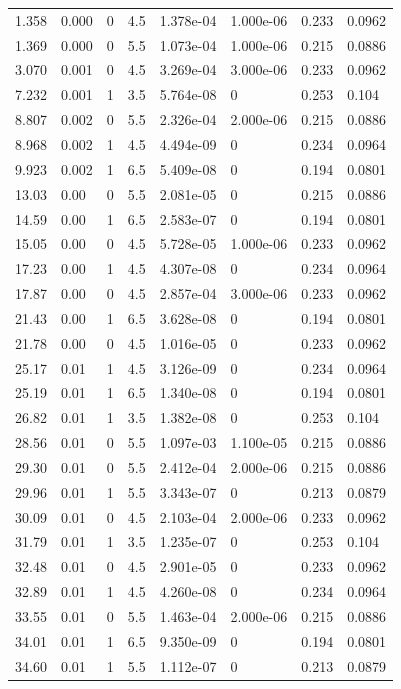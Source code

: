 \documentclass[preview]{standalone}
\begin{document}
{{\begin{tabular}{L{1.2cm}C{1.2cm} C{0.3cm}C{0.5cm} C{1.4cm}C{1.4cm} C{1.4cm}C{1.4cm}}
  1.358  &  0.000  & 0     & 4.5 &  1.378e-04  & 1.000e-06  & 0.233 &  0.0962   \\ 
  1.369  &  0.000  & 0     & 5.5 &  1.073e-04  & 1.000e-06  & 0.215 &  0.0886   \\ 
  3.070  &  0.001  & 0     & 4.5 &  3.269e-04  & 3.000e-06  & 0.233 &  0.0962   \\ 
  7.232  &  0.001  & 1     & 3.5 &  5.764e-08  & 0  & 0.253 &  0.104   \\ 
  8.807  &  0.002  & 0     & 5.5 &  2.326e-04  & 2.000e-06  & 0.215 &  0.0886   \\ 
  8.968  &  0.002  & 1     & 4.5 &  4.494e-09  & 0  & 0.234 &  0.0964   \\ 
  9.923  &  0.002  & 1     & 6.5 &  5.409e-08  & 0  & 0.194 &  0.0801   \\ 
  13.03  &  0.00  & 0     & 5.5 &  2.081e-05  & 0  & 0.215 &  0.0886   \\ 
  14.59  &  0.00  & 1     & 6.5 &  2.583e-07  & 0  & 0.194 &  0.0801   \\ 
  15.05  &  0.00  & 0     & 4.5 &  5.728e-05  & 1.000e-06  & 0.233 &  0.0962   \\ 
  17.23  &  0.00  & 1     & 4.5 &  4.307e-08  & 0  & 0.234 &  0.0964   \\ 
  17.87  &  0.00  & 0     & 4.5 &  2.857e-04  & 3.000e-06  & 0.233 &  0.0962   \\ 
  21.43  &  0.00  & 1     & 6.5 &  3.628e-08  & 0  & 0.194 &  0.0801   \\ 
  21.78  &  0.00  & 0     & 4.5 &  1.016e-05  & 0  & 0.233 &  0.0962   \\ 
  25.17  &  0.01  & 1     & 4.5 &  3.126e-09  & 0  & 0.234 &  0.0964   \\ 
  25.19  &  0.01  & 1     & 6.5 &  1.340e-08  & 0  & 0.194 &  0.0801   \\ 
  26.82  &  0.01  & 1     & 3.5 &  1.382e-08  & 0  & 0.253 &  0.104   \\ 
  28.56  &  0.01  & 0     & 5.5 &  1.097e-03  & 1.100e-05  & 0.215 &  0.0886   \\ 
  29.30  &  0.01  & 0     & 5.5 &  2.412e-04  & 2.000e-06  & 0.215 &  0.0886   \\ 
  29.96  &  0.01  & 1     & 5.5 &  3.343e-07  & 0  & 0.213 &  0.0879   \\ 
  30.09  &  0.01  & 0     & 4.5 &  2.103e-04  & 2.000e-06  & 0.233 &  0.0962   \\ 
  31.79  &  0.01  & 1     & 3.5 &  1.235e-07  & 0  & 0.253 &  0.104   \\ 
  32.48  &  0.01  & 0     & 4.5 &  2.901e-05  & 0  & 0.233 &  0.0962   \\ 
  32.89  &  0.01  & 1     & 4.5 &  4.260e-08  & 0  & 0.234 &  0.0964   \\ 
  33.55  &  0.01  & 0     & 5.5 &  1.463e-04  & 2.000e-06  & 0.215 &  0.0886   \\ 
  34.01  &  0.01  & 1     & 6.5 &  9.350e-09  & 0  & 0.194 &  0.0801   \\ 
  34.60  &  0.01  & 1     & 5.5 &  1.112e-07  & 0  & 0.213 &  0.0879   \\ 
\hline 
\end{tabular} 

}}
\end{document}
